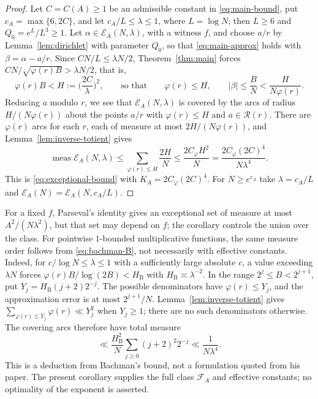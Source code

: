 \documentclass[11pt]{amsart}
\numberwithin{equation}{section}
\numberwithin{figure}{section}
\theoremstyle{definition}
\newcommand{\FA}{\mathcal F_A}
\begin{document}
\begin{proof}
Let $C=C(A)\ge1$ be an admissible constant in \eqref{eq:main-bound},
put $c_A=\max\{6,2C\}$, and let $c_A/L\le\lambda\le1$, where
$L=\log N$; then $L\ge6$ and $Q_0=e^L/L^3\ge1$. Let
$\alpha\in\mathcal E_A(N,\lambda)$, with a witness $f$, and choose
$a/r$ by Lemma~\ref{lem:dirichlet} with parameter $Q_0$, so that
\eqref{eq:main-approx} holds with $\beta=\alpha-a/r$. Since
$CN/L\le\lambda N/2$, Theorem~\ref{thm:main} forces
$CN/\sqrt{\varphi(r)B}>\lambda N/2$, that is,
\[
 \varphi(r)B<H:=\Big(\frac{2C}\lambda\Big)^2,
 \qquad\text{so that}\qquad
 \varphi(r)\le H,\qquad|\beta|\le\frac BN<\frac H{N\varphi(r)}.
\]
Reducing $a$ modulo $r$, we see that $\mathcal E_A(N,\lambda)$ is
covered by the arcs of radius $H/(N\varphi(r))$ about the points
$a/r$ with $\varphi(r)\le H$ and $a\in\mathcal R(r)$. There are
$\varphi(r)$ arcs for each $r$, each of measure at most
$2H/(N\varphi(r))$, and Lemma~\ref{lem:inverse-totient} gives
\[
 \operatorname{meas}\mathcal E_A(N,\lambda)
 \le\sum_{\varphi(r)\le H}\frac{2H}N\le\frac{2C_\varphi H^2}N
 =\frac{2C_\varphi(2C)^4}{N\lambda^4}.
\]
This is \eqref{eq:exceptional-bound} with $K_A=2C_\varphi(2C)^4$. For
$N\ge e^{c_A}$ take $\lambda=c_A/L$ and
$\mathcal E_A(N)=\mathcal E_A(N,c_A/L)$.
\end{proof}

For a fixed $f$, Parseval's identity gives an exceptional set of
measure at most $A^2/(N\lambda^2)$, but that set may depend on $f$;
the corollary controls the union over the class. For pointwise
$1$-bounded multiplicative functions, the same measure order follows
from \eqref{eq:bachman-B}, not necessarily with effective constants.
Indeed, for $c/\log N\le\lambda\le1$ with a sufficiently large
absolute $c$, a value exceeding $\lambda N$ forces
$\varphi(r)B/\log(2B)<H_{\mathrm B}$ with
$H_{\mathrm B}\asymp\lambda^{-2}$.
In the range $2^j\le B<2^{j+1}$, put
$Y_j=H_{\mathrm B}(j+2)2^{-j}$. The possible denominators have
$\varphi(r)\le Y_j$, and the approximation error is at most
$2^{j+1}/N$. Lemma~\ref{lem:inverse-totient} gives
$\sum_{\varphi(r)\le Y_j}\varphi(r)\ll Y_j^2$ when $Y_j\ge1$;
there are no such denominators otherwise. The covering arcs therefore
have total measure
\[
 \ll\frac{H_{\mathrm B}^2}{N}
       \sum_{j\ge0}(j+2)^2 2^{-j}
 \ll\frac1{N\lambda^4}.
\]
This is a deduction from Bachman's bound, not a formulation quoted
from his paper. The present corollary supplies the full class $\FA$
and effective constants; no optimality of the exponent is asserted.
\end{document}
